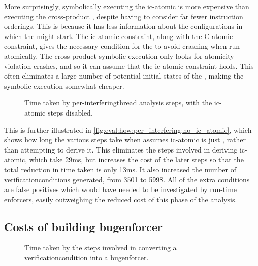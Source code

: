 More surprisingly, symbolically executing the \gls{ic-atomic}
{\StateMachine} is more expensive than executing the cross-product
{\StateMachine}, despite having to consider far fewer instruction
orderings.  This is because it has less information about the
configurations in which the {\StateMachines} might start.  The
\gls{ic-atomic} constraint, along with the C-atomic constraint, gives
the necessary condition for the {\StateMachines} to avoid crashing
when run atomically.  The cross-product symbolic execution only looks
for atomicity violation crashes, and so it can assume that the
\gls{ic-atomic} constraint holds.  This often eliminates a large
number of potential initial states of the {\StateMachines}, making the
symbolic execution somewhat cheaper.

\begin{figure}
  \centerline{
  }
  \caption{Time taken by per-\gls{interferingthread} analysis steps,
    with the \gls{ic-atomic} steps disabled.}
  \label{fig:eval:how:per_interfering:no_ic_atomic}
\end{figure}

This is further illustrated in
\autoref{fig:eval:how:per_interfering:no_ic_atomic}, which shows how
long the various steps take when {\technique} assumes \gls{ic-atomic}
is just \true, rather than attempting to derive it.  This eliminates
the steps involved in deriving \gls{ic-atomic}, which take 29ms, but
increases the cost of the later steps so that the total reduction in
time taken is only 13ms.  It also increased the number of
\glspl{verificationcondition} generated, from 3501 to 5998.  All of
the extra conditions are false positives which would have needed to be
investigated by run-time enforcers, easily outweighing the reduced
cost of this phase of the analysis.


\subsection{Costs of building \gls{bugenforcer}}

\begin{figure}
  \centerline{
  }
  \caption{Time taken by the steps involved in converting a
    \gls{verificationcondition} into a \gls{bugenforcer}.}
  \label{fig:eval:how:build_enforcer}
\end{figure}


